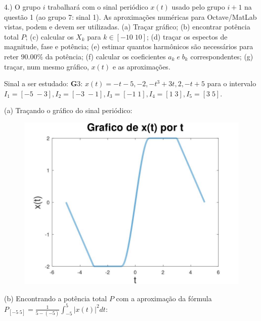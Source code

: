\documentclass{article}
\begin{document}
\vspace{\baselineskip}

4.) O grupo $i$ trabalhará com o sinal periódico $x(t)$ usado pelo grupo $i + 1$ na questão 1 (ao grupo 7: sinal 1). As aproximações numéricas para Octave/MatLab vistas, podem e devem ser utilizadas.
(a) Traçar gráfico;
(b) encontrar potência total $P$;
(c) calcular os $X_{k}$ para $k \in [-10\;10]$;
(d) traçar os espectos de magnitude, fase e potência;
(e) estimar quantos harmônicos são necessários para reter $90.00\%$ da potência;
(f) calcular os coeficientes $a_{k}\;e\;b_{k}$ correspondentes;
(g) traçar, num mesmo gráfico, $x(t)$ e as aproximações.

Sinal a ser estudado: {\textbf G3}: $x(t) = -t - 5, -2, -t^3 + 3t, 2, -t + 5$ para o intervalo $I_{1} = [-5\;-3], I_{2} = [-3\;-1], I_{3} = [-1\;1], I_{4} = [1\;3], I_{5} = [3\;5]$.

\vspace{\baselineskip}

(a) Traçando o gráfico do sinal periódico:

\begin{figure}[h!]
    \includegraphics[scale=0.3]{plot4a}
    \centering
\end{figure}

\vspace{\baselineskip}

(b) Encontrando a potência total $P$ com a aproximação da fórmula $P_{[-5\;5]} = \frac{1}{5 - (-5)} \int_{-5}^{5} |x(t)|^2 dt $:

\vspace{\baselineskip}
\end{document}
